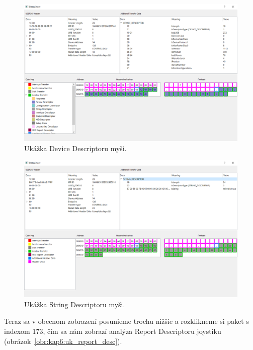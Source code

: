 \begin{figure}[!htb]
	\centering
	\includegraphics[width=\textwidth]{img/kap06_device_desc}
	\caption{Ukážka Device Descriptoru myši.}
	\label{obr:kap6:uk_device_desc}
\end{figure}

\begin{figure}[!htb]
	\centering
	\includegraphics[width=\textwidth]{img/kap06_uk_string_descriptor}
	\caption{Ukážka String Descriptoru myši.}
	\label{obr:kap6:uk_string_desc}
\end{figure}

Teraz sa v obecnom zobrazení posunieme trochu nižšie a rozklikneme si paket s indexom 173, čím sa nám zobrazí analýza Report Descriptoru joystiku (obrázok~\ref{obr:kap6:uk_report_desc}).

